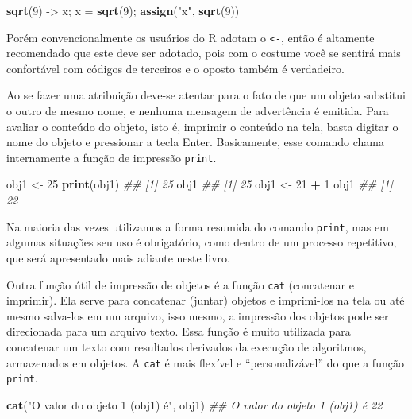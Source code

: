 \documentclass[
  11pt,
  a5paper,
  openany]{book}
\newenvironment{Shaded}{\begin{snugshade}}{\end{snugshade}}
\newcommand{\CommentTok}[1]{\textcolor[rgb]{0.56,0.35,0.01}{\textit{#1}}}
\newcommand{\DecValTok}[1]{\textcolor[rgb]{0.00,0.00,0.81}{#1}}
\newcommand{\KeywordTok}[1]{\textcolor[rgb]{0.13,0.29,0.53}{\textbf{#1}}}
\newcommand{\NormalTok}[1]{#1}
\newcommand{\OperatorTok}[1]{\textcolor[rgb]{0.81,0.36,0.00}{\textbf{#1}}}
\newcommand{\StringTok}[1]{\textcolor[rgb]{0.31,0.60,0.02}{#1}}
\begin{document}
\begin{Shaded}
\begin{Highlighting}[]
\KeywordTok{sqrt}\NormalTok{(}\DecValTok{9}\NormalTok{) ->}\StringTok{ }\NormalTok{x; x =}\StringTok{ }\KeywordTok{sqrt}\NormalTok{(}\DecValTok{9}\NormalTok{); }\KeywordTok{assign}\NormalTok{(}\StringTok{"x"}\NormalTok{, }\KeywordTok{sqrt}\NormalTok{(}\DecValTok{9}\NormalTok{))}
\end{Highlighting}
\end{Shaded}

Porém convencionalmente os usuários do R adotam o \texttt{\textless{}-}, então é altamente recomendado que este deve ser adotado, pois com o costume você se sentirá mais confortável com códigos de terceiros e o oposto também é verdadeiro.

Ao se fazer uma atribuição deve-se atentar para o fato de que um objeto substitui o outro de mesmo nome, e nenhuma mensagem de advertência é emitida. Para avaliar o conteúdo do objeto, isto é, imprimir o conteúdo na tela, basta digitar o nome do objeto e pressionar a tecla Enter. Basicamente, esse comando chama internamente a função de impressão \texttt{print}.

\begin{Shaded}
\begin{Highlighting}[]
\NormalTok{obj1 <-}\StringTok{ }\DecValTok{25}
\KeywordTok{print}\NormalTok{(obj1)}
\CommentTok{## [1] 25}
\NormalTok{obj1}
\CommentTok{## [1] 25}
\NormalTok{obj1 <-}\StringTok{ }\DecValTok{21} \OperatorTok{+}\StringTok{ }\DecValTok{1}
\NormalTok{obj1}
\CommentTok{## [1] 22}
\end{Highlighting}
\end{Shaded}

Na maioria das vezes utilizamos a forma resumida do comando \texttt{print}, mas em algumas situações seu uso é obrigatório, como dentro de um processo repetitivo, que será apresentado mais adiante neste livro.

Outra função útil de impressão de objetos é a função \texttt{cat} (concatenar e imprimir). Ela serve para concatenar (juntar) objetos e imprimi-los na tela ou até mesmo salva-los em um arquivo, isso mesmo, a impressão dos objetos pode ser direcionada para um arquivo texto. Essa função é muito utilizada para concatenar um texto com resultados derivados da execução de algoritmos, armazenados em objetos. A \texttt{cat} é mais flexível e ``personalizável'' do que a função \texttt{print}.

\begin{Shaded}
\begin{Highlighting}[]
\KeywordTok{cat}\NormalTok{(}\StringTok{"O valor do objeto 1 (obj1) é"}\NormalTok{, obj1)}
\CommentTok{## O valor do objeto 1 (obj1) é 22}
\end{Highlighting}
\end{Shaded}
\end{document}
